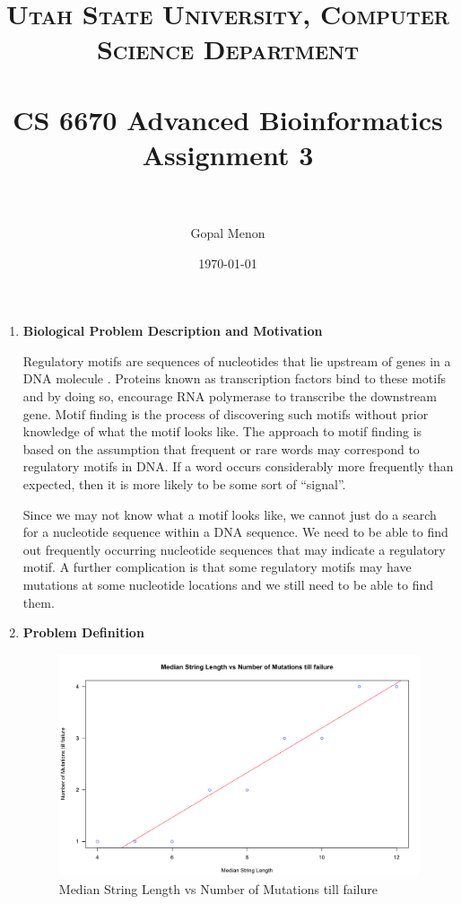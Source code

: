 \documentclass[paper=a4, fontsize=11pt]{scrartcl} %
\title{	
\normalfont \normalsize 
\textsc{Utah State University, Computer Science Department} \\ [25pt] %
\horrule{0.5pt} \\[0.4cm] %
\huge CS 6670 Advanced Bioinformatics\\Assignment 3 \\ %
\horrule{2pt} \\[0.5cm] %
}
\author{Gopal Menon} %
\date{\normalsize\today} %
\numberwithin{equation}{section} %
\numberwithin{figure}{section} %
\numberwithin{table}{section} %
\begin{document}
\maketitle %

\begin{enumerate}

\item \textbf{Biological Problem Description and Motivation}

Regulatory motifs are sequences of nucleotides that lie upstream of genes in a DNA molecule \cite{pevzner}. Proteins known as transcription factors bind to these motifs and by doing so, encourage RNA polymerase to transcribe the downstream gene. Motif finding is the process of discovering such motifs without prior knowledge of what the motif looks like. The approach to motif finding is based on the assumption that frequent or rare words may correspond to regulatory motifs in DNA. If a word occurs considerably more frequently than expected, then it is more likely to be some sort of \enquote{signal}.

Since we may not know what a motif looks like, we cannot just do a search for a nucleotide sequence within a DNA sequence. We need to be able to find out frequently occurring nucleotide sequences that may indicate a regulatory motif. A further complication is that some regulatory motifs may have mutations at some nucleotide locations and we still need to be able to find them.

\item \textbf{Problem Definition}

\begin{figure}[!h]
\centering
\includegraphics[width=6.75in]{Figures/MedianStringLenVsMutations.png}
\caption{Median String Length vs Number of Mutations till failure}
\label{MedStrLenVMutations}
\end{figure}


\end{enumerate}
\end{document}
